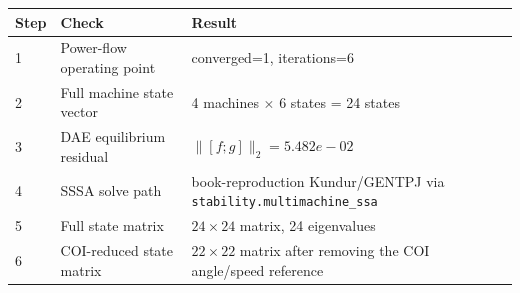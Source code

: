 \begingroup\footnotesize\setlength{\tabcolsep}{5pt}
\begin{tabular}{l l l}
\toprule
Step & Check & Result\\
\midrule
1 & Power-flow operating point & converged=1, iterations=6\\
2 & Full machine state vector & 4 machines $\times$ 6 states = 24 states\\
3 & DAE equilibrium residual & $\lVert[f;g]\rVert_2 = 5.482e-02$\\
4 & SSSA solve path & book-reproduction Kundur/GENTPJ via \texttt{stability.multimachine\_ssa}\\
5 & Full state matrix & $24\times24$ matrix, 24 eigenvalues\\
6 & COI-reduced state matrix & $22\times22$ matrix after removing the COI angle/speed reference\\
\bottomrule
\end{tabular}\endgroup

